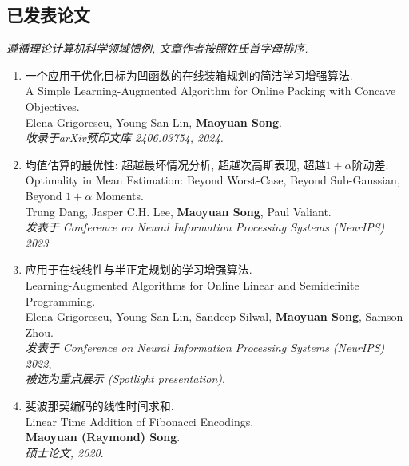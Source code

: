 \documentclass[margin, 10pt]{res-short} %
\begin{document}
\begin{resume}
\section{已发表论文}
{\it 遵循理论计算机科学领域惯例, 文章作者按照姓氏首字母排序.}
\begin{enumerate}
\item 一个应用于优化目标为凹函数的在线装箱规划的简洁学习增强算法.\\
A Simple Learning-Augmented Algorithm for Online Packing with Concave Objectives.\\
Elena Grigorescu, Young-San Lin, {\bf Maoyuan Song}.\\
\emph{收录于arXiv预印文库 2406.03754, 2024.}
\item 均值估算的最优性: 超越最坏情况分析, 超越次高斯表现, 超越$1 + \alpha$阶动差.\\
Optimality in Mean Estimation: Beyond Worst-Case, Beyond Sub-Gaussian, Beyond $1 + \alpha$ Moments.\\
Trung Dang, Jasper C.H. Lee, {\bf Maoyuan Song}, Paul Valiant.\\
\emph{发表于 Conference on Neural Information Processing Systems (NeurIPS) 2023}.
\item 应用于在线线性与半正定规划的学习增强算法.\\
Learning-Augmented Algorithms for Online Linear and Semidefinite Programming.\\
Elena Grigorescu, Young-San Lin, Sandeep Silwal, {\bf Maoyuan Song}, Samson Zhou.\\
\emph{发表于 Conference on Neural Information Processing Systems (NeurIPS) 2022},\\
\emph{被选为重点展示 (Spotlight presentation)}.
\item 斐波那契编码的线性时间求和.\\
Linear Time Addition of Fibonacci Encodings.\\
{\bf Maoyuan (Raymond) Song}.\\
\emph{硕士论文, 2020}.
\end{enumerate}


\end{resume}
\end{document}
